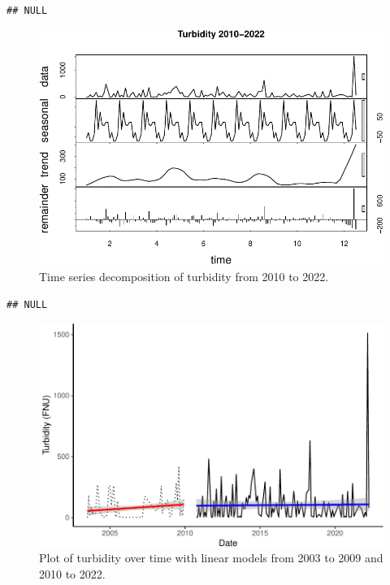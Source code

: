 \documentclass[
  12pt,
]{article}
\begin{document}
\begin{verbatim}
## NULL
\end{verbatim}

\begin{figure}

{\centering \includegraphics{Project_Template_files/figure-latex/Plot of Late Turbidity Time Series Decomposition-1} 

}

\caption{Time series decomposition of turbidity from 2010 to 2022.}\label{fig:Plot of Late Turbidity Time Series Decomposition}
\end{figure}

\begin{verbatim}
## NULL
\end{verbatim}

\newpage

\begin{figure}

{\centering \includegraphics{Project_Template_files/figure-latex/Plot of Turbidity over time with LMs-1} 

}

\caption{Plot of turbidity over time with linear models from 2003 to 2009 and 2010 to 2022.}\label{fig:Plot of Turbidity over time with LMs}
\end{figure}
\end{document}
